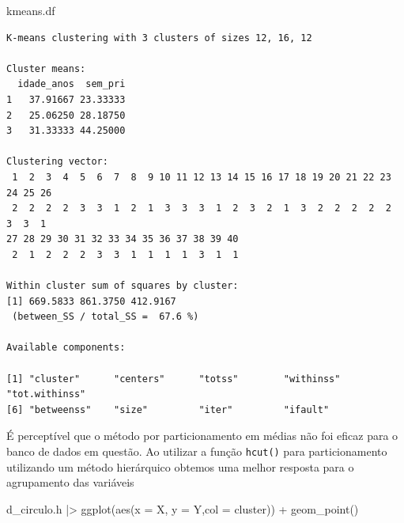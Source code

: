 \documentclass[
  letterpaper,
  DIV=11,
  numbers=noendperiod]{scrreprt}
\newenvironment{Shaded}{\begin{snugshade}}{\end{snugshade}}
\newcommand{\AttributeTok}[1]{\textcolor[rgb]{0.40,0.45,0.13}{#1}}
\newcommand{\DecValTok}[1]{\textcolor[rgb]{0.68,0.00,0.00}{#1}}
\newcommand{\FunctionTok}[1]{\textcolor[rgb]{0.28,0.35,0.67}{#1}}
\newcommand{\NormalTok}[1]{\textcolor[rgb]{0.00,0.23,0.31}{#1}}
\newcommand{\OtherTok}[1]{\textcolor[rgb]{0.00,0.23,0.31}{#1}}
\newcommand{\SpecialCharTok}[1]{\textcolor[rgb]{0.37,0.37,0.37}{#1}}
\newcommand{\StringTok}[1]{\textcolor[rgb]{0.13,0.47,0.30}{#1}}
\begin{document}
\begin{Shaded}
\begin{Highlighting}[]
\NormalTok{kmeans.df}
\end{Highlighting}
\end{Shaded}

\begin{verbatim}
K-means clustering with 3 clusters of sizes 12, 16, 12

Cluster means:
  idade_anos  sem_pri
1   37.91667 23.33333
2   25.06250 28.18750
3   31.33333 44.25000

Clustering vector:
 1  2  3  4  5  6  7  8  9 10 11 12 13 14 15 16 17 18 19 20 21 22 23 24 25 26 
 2  2  2  2  3  3  1  2  1  3  3  3  1  2  3  2  1  3  2  2  2  2  2  3  3  1 
27 28 29 30 31 32 33 34 35 36 37 38 39 40 
 2  1  2  2  2  3  3  1  1  1  1  3  1  1 

Within cluster sum of squares by cluster:
[1] 669.5833 861.3750 412.9167
 (between_SS / total_SS =  67.6 %)

Available components:

[1] "cluster"      "centers"      "totss"        "withinss"     "tot.withinss"
[6] "betweenss"    "size"         "iter"         "ifault"      
\end{verbatim}

É perceptível que o método por particionamento em médias não foi eficaz
para o banco de dados em questão. Ao utilizar a função \texttt{hcut()}
para particionamento utilizando um método hierárquico obtemos uma melhor
resposta para o agrupamento das variáveis

\begin{Shaded}
\end{Shaded}

\begin{Shaded}
\begin{Highlighting}[]
\NormalTok{d\_circulo.h }\SpecialCharTok{|\textgreater{}} 
  \FunctionTok{ggplot}\NormalTok{(}\FunctionTok{aes}\NormalTok{(}\AttributeTok{x =}\NormalTok{ X, }\AttributeTok{y =}\NormalTok{ Y,}\AttributeTok{col =}\NormalTok{ cluster)) }\SpecialCharTok{+}
  \FunctionTok{geom\_point}\NormalTok{()}
\end{Highlighting}
\end{Shaded}
\end{document}
